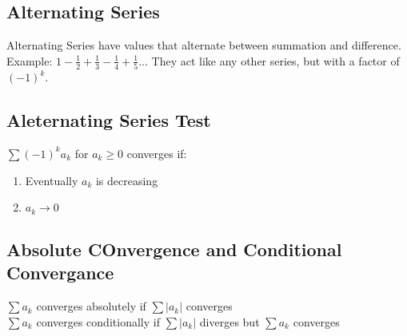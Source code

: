 \documentclass{article}
\begin{document}
\subsection{Alternating Series}
Alternating Series have values that alternate between summation and difference. Example: $1 - \frac{1}{2} + \frac{1}{3} - \frac{1}{4} + \frac{1}{5} ...$ They act like any other series, but with a factor of $(-1)^k$.

\subsection{Aleternating Series Test}
$\sum (-1)^k a_k$ for $a_k \geq 0$ converges if:
\begin{enumerate}
  \item Eventually $a_k$ is decreasing
  \item $a_k \to 0$
\end{enumerate}

\subsection{Absolute COnvergence and Conditional Convergance}
$\sum a_k$ converges absolutely if $\sum |a_k|$ converges\\
$\sum a_k$ converges conditionally if $\sum |a_k|$ diverges but $\sum a_k$ converges\\
\end{document}
